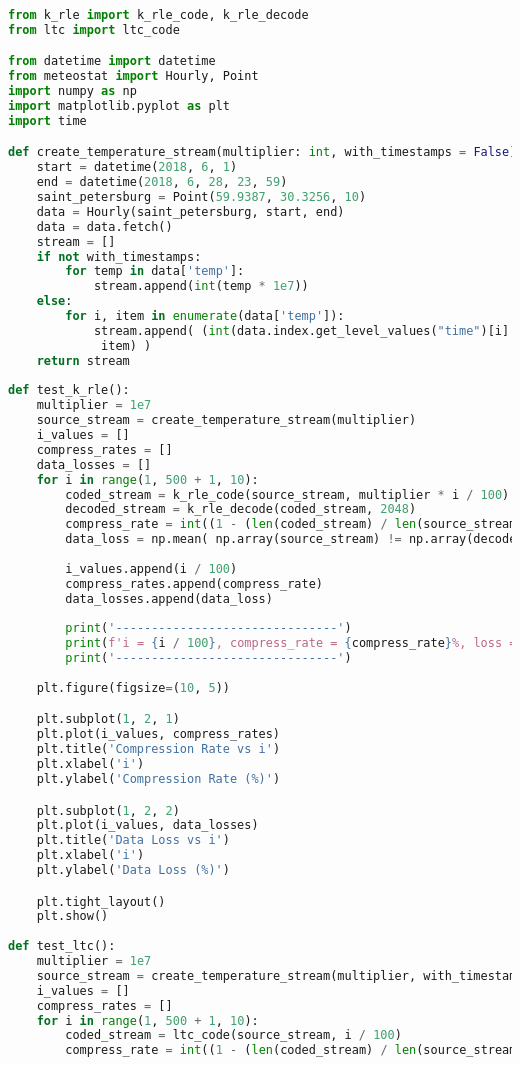 \begin{lstlisting}[language=python, caption=Исходный код для тестирования алгоритмов, captionpos=b, frame=single]
from k_rle import k_rle_code, k_rle_decode
from ltc import ltc_code

from datetime import datetime
from meteostat import Hourly, Point
import numpy as np
import matplotlib.pyplot as plt
import time

def create_temperature_stream(multiplier: int, with_timestamps = False):
    start = datetime(2018, 6, 1)
    end = datetime(2018, 6, 28, 23, 59)
    saint_petersburg = Point(59.9387, 30.3256, 10) 
    data = Hourly(saint_petersburg, start, end)
    data = data.fetch()
    stream = []
    if not with_timestamps:
        for temp in data['temp']:
            stream.append(int(temp * 1e7))
    else:
        for i, item in enumerate(data['temp']):
            stream.append( (int(data.index.get_level_values("time")[i].timestamp()),
             item) )
    return stream
    
def test_k_rle():
    multiplier = 1e7
    source_stream = create_temperature_stream(multiplier)
    i_values = []
    compress_rates = []
    data_losses = []
    for i in range(1, 500 + 1, 10):
        coded_stream = k_rle_code(source_stream, multiplier * i / 100)
        decoded_stream = k_rle_decode(coded_stream, 2048)
        compress_rate = int((1 - (len(coded_stream) / len(source_stream))) * 100)
        data_loss = np.mean( np.array(source_stream) != np.array(decoded_stream) )*100
        
        i_values.append(i / 100)
        compress_rates.append(compress_rate)
        data_losses.append(data_loss)
        
        print('-------------------------------')
        print(f'i = {i / 100}, compress_rate = {compress_rate}%, loss = {data_loss}%')
        print('-------------------------------')
        
    plt.figure(figsize=(10, 5))

    plt.subplot(1, 2, 1)
    plt.plot(i_values, compress_rates)
    plt.title('Compression Rate vs i')
    plt.xlabel('i')
    plt.ylabel('Compression Rate (%)')

    plt.subplot(1, 2, 2)
    plt.plot(i_values, data_losses)
    plt.title('Data Loss vs i')
    plt.xlabel('i')
    plt.ylabel('Data Loss (%)')

    plt.tight_layout()
    plt.show()    
    
def test_ltc():
    multiplier = 1e7
    source_stream = create_temperature_stream(multiplier, with_timestamps=True)
    i_values = []
    compress_rates = []
    for i in range(1, 500 + 1, 10):
        coded_stream = ltc_code(source_stream, i / 100)
        compress_rate = int((1 - (len(coded_stream) / len(source_stream))) * 100)
        

\end{lstlisting}

